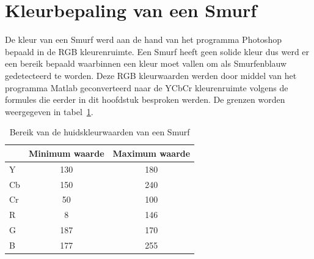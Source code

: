 \section{Kleurbepaling van een Smurf}

	\par De kleur van een Smurf werd aan de hand van het programma Photoshop bepaald in de RGB kleurenruimte. Een Smurf heeft geen solide kleur dus werd er een bereik bepaald waarbinnen een kleur moet vallen om als Smurfenblauw gedetecteerd te worden. Deze RGB kleurwaarden werden door middel van het programma Matlab geconverteerd naar de YCbCr kleurenruimte volgens de formules die eerder in dit hoofdstuk besproken werden. De grenzen worden weergegeven in tabel~\ref{tbl:huidskleurwaarden}.

		\begin{table}[h]
			\centering
			\begin{tabular}{l|cc}
			\multicolumn{1}{c}{} & Minimum waarde & Maximum waarde \\
			\hline
			Y                    & 130            & 180            \\
			Cb                   & 150            & 240            \\
			Cr                   & 50             & 100            \\
			\hline
			\hline
			R                    & 8              & 146            \\
			G                    & 187            & 170            \\
			B                    & 177            & 255        	   \\
			\hline   
			\end{tabular}
		\caption{Bereik van de huidskleurwaarden van een Smurf}
		\label{tbl:huidskleurwaarden}
		\end{table}

